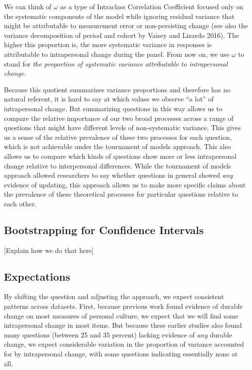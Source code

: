 \documentclass[
  12pt,
]{article}
\begin{document}
We can think of \(\omega\) as a type of Intraclass Correlation
Coefficient focused only on the systematic components of the model while
ignoring residual variance that might be attributable to measurement
error or non-persisting change (see also the variance decomposition of
period and cohort by Vaisey and Lizardo 2016). The higher this
proportion is, the more systematic variance in responses is attributable
to intrapersonal change during the panel. From now on, we use \(\omega\)
to stand for \emph{the proportion of systematic variance attributable to
intrapersonal change}.

Because this quotient summarizes variance proportions and therefore has
no natural referent, it is hard to say at which values we observe ``a
lot'' of intrapersonal change. But summarizing questions in this way
allows us to compare the relative importance of our two broad processes
across a range of questions that might have different levels of
non-systematic variance. This gives us a sense of the relative
prevalence of these two processes for each question, which is not
achievable under the tournament of models approach. This also allows us
to compare which kinds of questions show more or less intrapersonal
change relative to interpersonal differences. While the tournament of
models approach allowed researchers to say whether questions in general
showed \emph{any} evidence of updating, this approach allows us to make
more specific claims about the prevalence of these theoretical processes
for particular questions relative to each other.

\hypertarget{bootstrapping-for-confidence-intervals}{%
\subsection{Bootstrapping for Confidence
Intervals}\label{bootstrapping-for-confidence-intervals}}

{[}Explain how we do that here{]}

\hypertarget{expectations}{%
\subsection{Expectations}\label{expectations}}

By shifting the question and adjusting the approach, we expect
consistent patterns across datasets. First, because previous work found
evidence of durable change on most measures of personal culture, we
expect that we will find some intrapersonal change in most items. But
because these earlier studies also found many questions (between 25 and
35 percent) lacking evidence of \emph{any} durable change, we expect
considerable variation in the proportion of variance accounted for by
intrapersonal change, with some questions indicating essentially none at
all.
\end{document}
